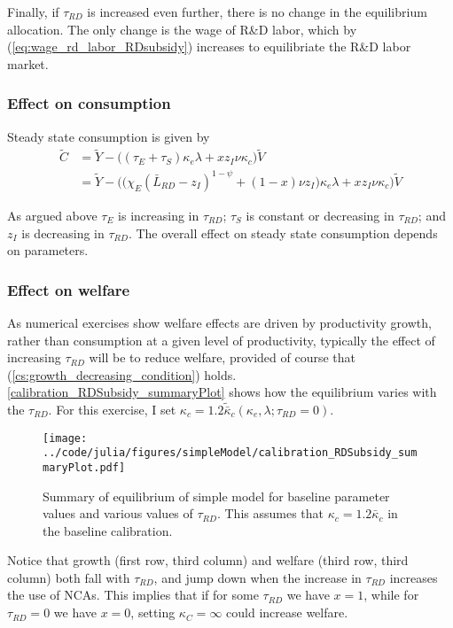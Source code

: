 \documentclass[11pt,english]{article}
\theoremstyle{remark}
\begin{document}
Finally, if $\tau_{RD}$ is increased even further, there is no change in the equilibrium allocation. The only change is the wage of R\&D labor, which by (\ref{eq:wage_rd_labor_RDsubsidy}) increases to equilibriate the R\&D labor market.

\subsubsection{Effect on consumption}

Steady state consumption is given by
\begin{align}
\tilde{C} &= \tilde{Y} - \Big( (\tau_E  + \tau_S)\kappa_e \lambda + x z_I \nu \kappa_c \Big) \tilde{V} \\
&= \tilde{Y} - \Big( \big( \chi_E (\bar{L}_{RD} - z_I)^{1-\psi} + (1-x) \nu z_I \big) \kappa_e \lambda + x z_I \nu \kappa_c \Big) \tilde{V}  \label{cs:scen2:consumption_eq}
\end{align}

As argued above $\tau_E$ is increasing in $\tau_{RD}$; $\tau_S$ is constant or decreasing in $\tau_{RD}$; and $z_I$ is decreasing in $\tau_{RD}$. The overall effect on steady state consumption depends on parameters. 

\subsubsection{Effect on welfare}

As numerical exercises show welfare effects are driven by productivity growth, rather than consumption at a given level of productivity, typically the effect of increasing $\tau_{RD}$ will be to reduce welfare, provided of course that (\ref{cs:growth_decreasing_condition}) holds. \autoref{calibration_RDSubsidy_summaryPlot} shows how the equilibrium varies with the $\tau_{RD}$. For this exercise, I set $\kappa_c = 1.2 \tilde{\bar{\kappa}}_c(\kappa_e,\lambda;\tau_{RD} = 0)$. 

\begin{figure}[]
	\texttt{[image: ../code/julia/figures/simpleModel/calibration\_RDSubsidy\_summaryPlot.pdf]}
	\caption{Summary of equilibrium of simple model for baseline parameter values and various values of $\tau_{RD}$. This assumes that $\kappa_c = 1.2 \bar{\kappa}_c$ in the baseline calibration.}
	\label{calibration_RDSubsidy_summaryPlot}
\end{figure}

Notice that growth (first row, third column) and welfare (third row, third column) both fall with $\tau_{RD}$, and jump down when the increase in $\tau_{RD}$ increases the use of NCAs. This implies that if for some $\tau_{RD}$ we have $x = 1$, while for $\tau_{RD} = 0$ we have $x = 0$, setting $\kappa_C = \infty$ could increase welfare. 
\end{document}
